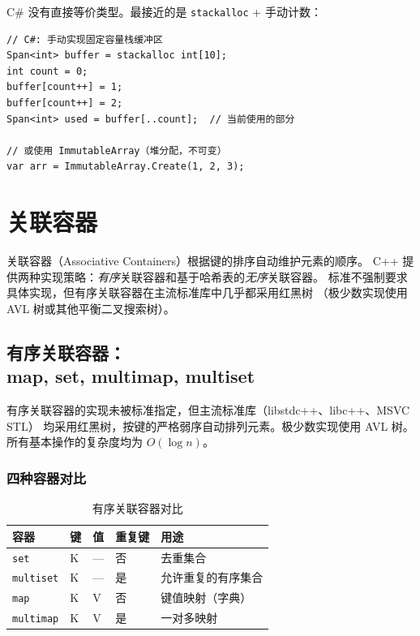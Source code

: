 \documentclass[12pt,a4paper,fontset=fandol]{ctexbook}
\newcommand{\Tp}[1]{\texttt{#1}}
\begin{document}
\begin{compare}
C\# 没有直接等价类型。最接近的是 \texttt{stackalloc} + 手动计数：
\begin{lstlisting}[style=csharpstyle]
// C#: 手动实现固定容量栈缓冲区
Span<int> buffer = stackalloc int[10];
int count = 0;
buffer[count++] = 1;
buffer[count++] = 2;
Span<int> used = buffer[..count];  // 当前使用的部分

// 或使用 ImmutableArray（堆分配，不可变）
var arr = ImmutableArray.Create(1, 2, 3);
\end{lstlisting}
\end{compare}

\part{关联容器}

关联容器（Associative Containers）根据键的排序自动维护元素的顺序。
C++ 提供两种实现策略：\emph{有序}关联容器和基于哈希表的\emph{无序}关联容器。
标准不强制要求具体实现，但有序关联容器在主流标准库中几乎都采用红黑树
（极少数实现使用 AVL 树或其他平衡二叉搜索树）。

\chapter[有序关联容器：map, set, multimap, multiset]{有序关联容器：\\map,\allowbreak{} set,\allowbreak{} multimap,\allowbreak{} multiset}

有序关联容器的实现未被标准指定，但主流标准库（libstdc++、libc++、MSVC STL）
均采用红黑树，按键的严格弱序自动排列元素。极少数实现使用 AVL 树。
所有基本操作的复杂度均为 $O(\log n)$。

\section{四种容器对比}

\begin{table}[htbp]
\centering
\caption{有序关联容器对比}
\begin{tabularx}{\textwidth}{l l l l X}
\toprule
\textbf{容器} & \textbf{键} & \textbf{值} & \textbf{重复键} & \textbf{用途} \\
\midrule
\Tp{set}             & K & --- & 否 & 去重集合 \\
\Tp{multiset}        & K & --- & 是 & 允许重复的有序集合 \\
\Tp{map}             & K & V & 否 & 键值映射（字典） \\
\Tp{multimap}        & K & V & 是 & 一对多映射 \\
\bottomrule
\end{tabularx}
\end{table}
\end{document}
